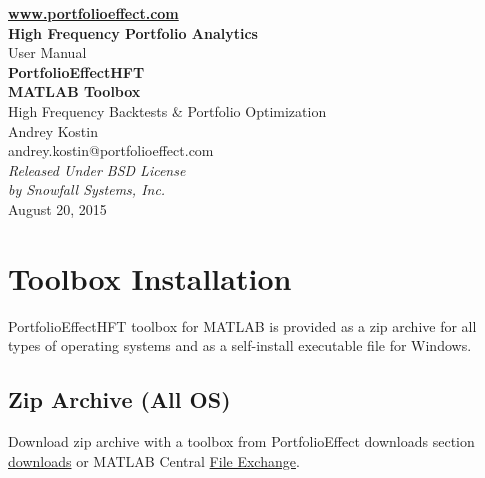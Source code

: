\documentclass[letterpaper]{report}
\begin{document}
\begin{titlepage}
\begin{center}
\vspace{5cm}
{\bfseries\href{https://www.portfolioeffect.com}{www.portfolioeffect.com} \\
High Frequency Portfolio Analytics\\}
\vspace{8cm}
{\huge User Manual \\}
\vspace{0.3cm}
{\Huge\bfseries PortfolioEffectHFT \\ MATLAB Toolbox \\}
\vspace{0.4cm} 
{\Large High Frequency Backtests \& Portfolio Optimization \\}
\vspace{1.5cm}
{Andrey Kostin \\ andrey.kostin@portfolioeffect.com} \\[14pt]
\vfill
\emph{{Released Under BSD License\\ by Snowfall Systems,
Inc.}}\\[2cm]
{August 20, 2015}
\end{center}
\end{titlepage}

\cleardoublepage
{}
{}
\renewcommand{\bibname}{Contents}
\tableofcontents 

\chapter{Toolbox Installation}
PortfolioEffectHFT toolbox for MATLAB is provided as a zip archive for all
types of operating systems and as a self-install executable file for Windows. 

\section{Zip Archive (All OS)}
Download zip archive with a toolbox from PortfolioEffect downloads section 
\href{https://www.portfolioeffect.com/docs/platform/quant/downloads}{downloads}
or MATLAB Central 
\href{http://www.mathworks.com/matlabcentral/fileexchange}{File Exchange}.
\end{document}
